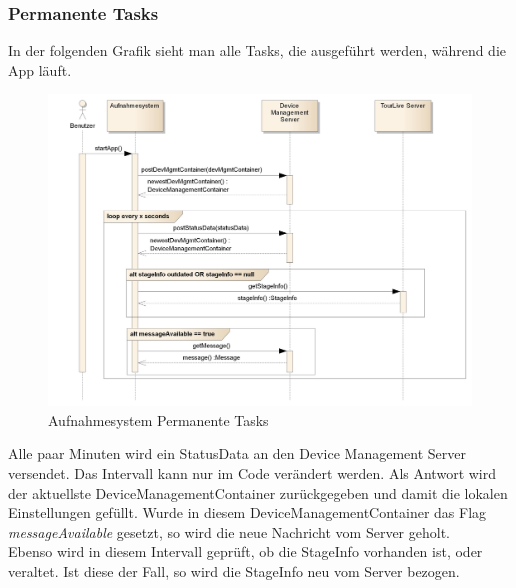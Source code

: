 \subsubsection{Permanente Tasks}
In der folgenden Grafik sieht man alle Tasks, die ausgeführt werden, während die App läuft. 
\begin{figure}[H]
	\centering
	\includegraphics[width=150mm]{images/android/permanent_taskes.jpg}
	\caption{Aufnahmesystem Permanente Tasks}
\end{figure}
Alle paar Minuten wird ein StatusData an den Device Management Server versendet. Das Intervall kann nur im Code verändert werden. Als Antwort wird der aktuellste DeviceManagementContainer zurückgegeben und damit die lokalen Einstellungen gefüllt. Wurde in diesem DeviceManagementContainer das Flag \textit{messageAvailable} gesetzt, so wird die neue Nachricht vom Server geholt.\\
Ebenso wird in diesem Intervall geprüft, ob die StageInfo vorhanden ist, oder veraltet. Ist diese der Fall, so wird die StageInfo neu vom Server bezogen.

\pagebreak

